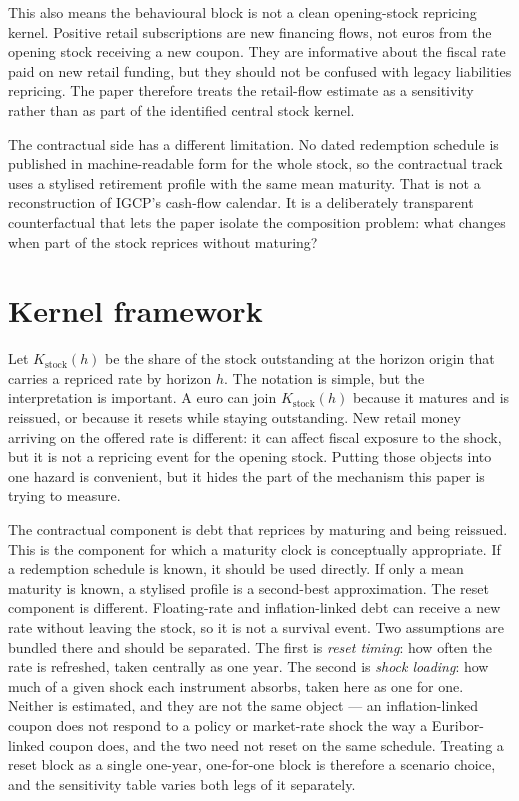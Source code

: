 \documentclass[11pt,a4paper]{article}
\begin{document}
This also means the behavioural block is not a clean opening-stock repricing
kernel. Positive retail subscriptions are new financing flows, not euros from
the opening stock receiving a new coupon. They are informative about the fiscal
rate paid on new retail funding, but they should not be confused with legacy
liabilities repricing. The paper therefore treats the retail-flow estimate as a
sensitivity rather than as part of the identified central stock kernel.

The contractual side has a different limitation. No dated redemption schedule
is published in machine-readable form for the whole stock, so the contractual
track uses a stylised retirement profile with the same mean maturity. That is
not a reconstruction of IGCP's cash-flow calendar. It is a deliberately
transparent counterfactual that lets the paper isolate the composition problem:
what changes when part of the stock reprices without maturing?

\section{Kernel framework}
\label{sec:framework}

Let $K_{\mathrm{stock}}(h)$ be the share of the stock outstanding at the
horizon origin that carries a repriced rate by horizon $h$. The notation is
simple, but the interpretation is important. A euro can join
$K_{\mathrm{stock}}(h)$ because it matures and is reissued, or because it
resets while staying outstanding. New retail money arriving on the offered
rate is different: it can affect fiscal exposure to the shock, but it is not a
repricing event for the opening stock. Putting those objects into one hazard is
convenient, but it hides the part of the mechanism this paper is trying to
measure.

The contractual component is debt that reprices by maturing and being reissued.
This is the component for which a maturity clock is conceptually appropriate.
If a redemption schedule is known, it should be used directly. If only a mean
maturity is known, a stylised profile is a second-best approximation. The reset
component is different. Floating-rate and inflation-linked debt can receive a
new rate without leaving the stock, so it is not a survival event. Two
assumptions are bundled there and should be separated. The first is
\emph{reset timing}: how often the rate is refreshed, taken centrally as one
year. The second is \emph{shock loading}: how much of a given shock each
instrument absorbs, taken here as one for one. Neither is estimated, and they
are not the same object --- an inflation-linked coupon does not respond to a
policy or market-rate shock the way a Euribor-linked coupon does, and the two
need not reset on the same schedule. Treating a reset block as a single
one-year, one-for-one block is therefore a scenario choice, and the sensitivity
table varies both legs of it separately.
\end{document}

